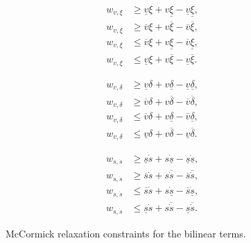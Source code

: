 \begin{figure}[h]
	\centering
	\begin{subfigure}[b]{0.3\textwidth}
		\centering
		\[
			\begin{aligned}
				w_{v,\xi} & \geq \underline{v} \xi + v \underline{\xi} - \underline{v} \underline{\xi}, \\
				w_{v,\xi} & \geq \overline{v} \xi + v \overline{\xi} - \overline{v} \overline{\xi},     \\
				w_{v,\xi} & \leq \overline{v} \xi + v \underline{\xi} - \overline{v} \underline{\xi},   \\
				w_{v,\xi} & \leq \underline{v} \xi + v \overline{\xi} - \underline{v} \overline{\xi}.
			\end{aligned}
		\]
	\end{subfigure}
	\hfill
	\begin{subfigure}[b]{0.3\textwidth}
		\centering
		\[
			\begin{aligned}
				w_{v,\delta} & \geq \underline{v} \delta + v \underline{\delta} - \underline{v} \underline{\delta}, \\
				w_{v,\delta} & \geq \overline{v} \delta + v \overline{\delta} - \overline{v} \overline{\delta},     \\
				w_{v,\delta} & \leq \overline{v} \delta + v \underline{\delta} - \overline{v} \underline{\delta},   \\
				w_{v,\delta} & \leq \underline{v} \delta + v \overline{\delta} - \underline{v} \overline{\delta}.
			\end{aligned}
		\]
	\end{subfigure}
	\hfill
	\begin{subfigure}[b]{0.3\textwidth}
		\centering
		\[
			\begin{aligned}
				w_{s,\dot{s}} & \geq \underline{s} \dot{s} + s \underline{\dot{s}} - \underline{s} \underline{\dot{s}}, \\
				w_{s,\dot{s}} & \geq \overline{s} \dot{s} + s \overline{\dot{s}} - \overline{s} \overline{\dot{s}},     \\
				w_{s,\dot{s}} & \leq \overline{s} \dot{s} + s \underline{\dot{s}} - \overline{s} \underline{\dot{s}},   \\
				w_{s,\dot{s}} & \leq \underline{s} \dot{s} + s \overline{\dot{s}} - \underline{s} \overline{\dot{s}}.
			\end{aligned}
		\]
	\end{subfigure}
	\caption{McCormick relaxation constraints for the bilinear terms.}
	\label{fig:mccormick_constraints}
\end{figure}

